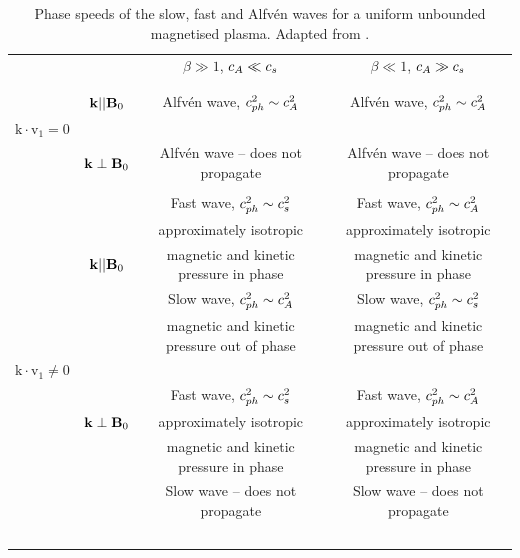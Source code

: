     \begin{table}
	    \centering
		\begin{tabular}{lccc}
   			&			& $\beta \gg 1$, $c_A \ll c_s$	&   $\beta \ll 1$, $c_A \gg c_s$ 	 	\\
   			\vspace{-3mm} \\
   			\hline
   			\hline
   			\vspace{-2mm} \\
   			& $\bm{\mathrm{k}} || \bm{\mathrm{B}}_0$		& Alfv\'{e}n wave, $c_{ph}^2 \sim c_A^2$		& Alfv\'{e}n wave, $c_{ph}^2 \sim c_A^2$	\\
   			$\bm{\mathrm{k}} \cdot \boldsymbol{\mathrm{v}}_1 = 0$	&					&									&								\\
   			& $\bm{\mathrm{k}} \perp \bm{\mathrm{B}}_0$	& Alfv\'{e}n wave -- does not propagate 		& Alfv\'{e}n wave -- does not propagate	\\
   			\vspace{2mm} \\
   			& 					& Fast wave, $c_{ph}^2 \sim c_s^2$	 		& Fast wave, $c_{ph}^2 \sim c_A^2$		\\
   			& 					& approximately isotropic	 			& approximately isotropic		\\
   			& $\bm{\mathrm{k}} || \bm{\mathrm{B}}_0$		& magnetic and kinetic pressure in phase	& magnetic and kinetic pressure in phase	\\
   			& 					& Slow wave, $c_{ph}^2 \sim c_A^2$	 		& Slow wave, $c_{ph}^2 \sim c_s^2$		\\
   			& 					& magnetic and kinetic pressure out of phase	& magnetic and kinetic pressure out of phase	\\
   			$\bm{\mathrm{k}} \cdot \boldsymbol{\mathrm{v}}_1 \neq 0$&					&									&							\\
   			& 					& Fast wave, $c_{ph}^2 \sim c_s^2$	 		& Fast wave, $c_{ph}^2 \sim c_A^2$		\\
   			& $\bm{\mathrm{k}} \perp \bm{\mathrm{B}}_0$	& approximately isotropic	 			& approximately isotropic		\\
   			& 					& magnetic and kinetic pressure in phase	& magnetic and kinetic pressure in phase	\\
   			& 					& Slow wave -- does not propagate	 		& Slow wave -- does not propagate		\\
   			\hline
   			~&~&~ \\
   		\end{tabular}
		\caption{
				 Phase speeds of the slow, fast and Alfv\'{e}n waves for a uniform unbounded magnetised plasma.
			     Adapted from \cite{jess2015multiwavelength}.
			    }
		\label{tab:uniform_medium}
     \end{table}
     
